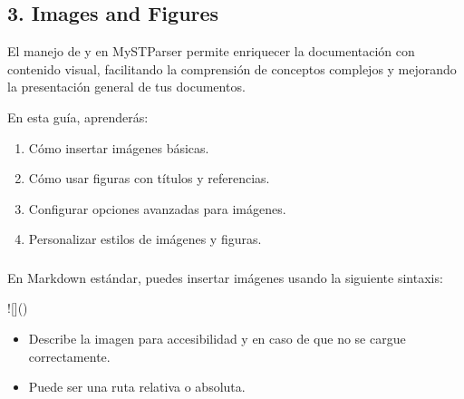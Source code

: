 \documentclass[a4paper,10pt,spanish]{sphinxmanual}
\begin{document}
\subsection{3. Images and Figures}
\label{\detokenize{configuracion_inicial/013.guia_de_myst_parser:images-and-figures}}
\sphinxAtStartPar
El manejo de  y  en MyST\sphinxhyphen{}Parser permite enriquecer la documentación con contenido visual, facilitando la comprensión de conceptos complejos y mejorando la presentación general de tus documentos.

\sphinxAtStartPar
En esta guía, aprenderás:
\begin{enumerate}
%
\item {} 
\sphinxAtStartPar
Cómo insertar imágenes básicas.

\item {} 
\sphinxAtStartPar
Cómo usar figuras con títulos y referencias.

\item {} 
\sphinxAtStartPar
Configurar opciones avanzadas para imágenes.

\item {} 
\sphinxAtStartPar
Personalizar estilos de imágenes y figuras.

\end{enumerate}


\subsubsection{}
\label{\detokenize{configuracion_inicial/013.guia_de_myst_parser:imagenes-basicas-en-myst-parser}}

\paragraph{}
\label{\detokenize{configuracion_inicial/013.guia_de_myst_parser:sintaxis-basica-para-insertar-una-imagen}}
\sphinxAtStartPar
En Markdown estándar, puedes insertar imágenes usando la siguiente sintaxis:

\begin{sphinxVerbatim}[commandchars=\\\{\}]
![]()
\end{sphinxVerbatim}
\begin{itemize}
\item {} 
\sphinxAtStartPar
{} Describe la imagen para accesibilidad y en caso de que no se cargue correctamente.

\item {} 
\sphinxAtStartPar
{} Puede ser una ruta relativa o absoluta.

\end{itemize}
\end{document}
